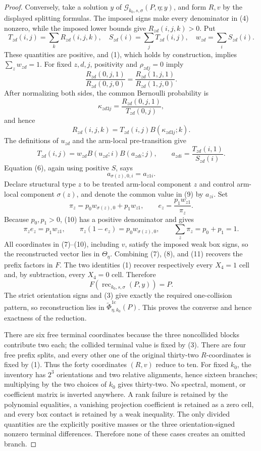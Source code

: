 \documentclass{article}
\begin{document}
\begin{proof}
Conversely, take a solution \(y\) of \(\mathscr G_{k_0,s,\sigma}(P,\eta;y)\), and form \(R,v\) by the displayed splitting formulas.  The imposed signs make every denominator in (4) nonzero, while the imposed lower bounds give \(R_{zd}(i,j,k)>0\).  Put
\[
 T_{zd}(i,j)=\sum_kR_{zd}(i,j,k),\quad
 S_{zd}(i)=\sum_jT_{zd}(i,j),\quad
 w_{zd}=\sum_iS_{zd}(i).
\]
These quantities are positive, and (1), which holds by construction, implies \(\sum_z w_{zd}=1\).  For fixed \(z,d,j\), positivity and \(\rho_{zdj}=0\) imply
\[
 \frac{R_{zd}(0,j,1)}{R_{zd}(0,j,0)}
 =\frac{R_{zd}(1,j,1)}{R_{zd}(1,j,0)}.
\]
After normalizing both sides, the common Bernoulli probability is
\[
 \kappa_{zd3j}=\frac{R_{zd}(0,j,1)}{T_{zd}(0,j)},
 \]
and hence
\[
 R_{zd}(i,j,k)=T_{zd}(i,j)B(\kappa_{zd3j};k).
 \tag{7}
\]
The definitions of \(u_{zd}\) and the arm-local pre-transition give
\[
 T_{zd}(i,j)=w_{zd}B(u_{zd};i)B(a_{zdi};j),
 \qquad a_{zdi}=\frac{T_{zd}(i,1)}{S_{zd}(i)}.
 \tag{8}
\]
Equation (6), again using positive \(S\), says
\[
 a_{\sigma(z),0,i}=a_{z1i}.
 \tag{9}
\]
Declare structural type \(z\) to be treated arm-local component \(z\) and control arm-local component \(\sigma(z)\), and denote the common value in (9) by \(a_{zi}\).  Set
\[
 \pi_z=p_0w_{\sigma(z),0}+p_1w_{z1},
 \qquad e_z=\frac{p_1w_{z1}}{\pi_z}.
 \tag{10}
\]
Because \(p_0,p_1>0\), (10) has a positive denominator and gives
\[
 \pi_ze_z=p_1w_{z1},\qquad
 \pi_z(1-e_z)=p_0w_{\sigma(z),0},\qquad
 \sum_z\pi_z=p_0+p_1=1.
 \tag{11}
\]
All coordinates in (7)--(10), including \(v\), satisfy the imposed weak box signs, so the reconstructed vector lies in \(\Theta_\eta\).  Combining (7), (8), and (11) recovers the prefix factors in \(F\).  The two identities (1) recover respectively every \(X_4=1\) cell and, by subtraction, every \(X_4=0\) cell.  Therefore
\[
 F(\operatorname{rec}_{k_0,s,\sigma}(P,y))=P.
\]
The strict orientation signs and (3) give exactly the required one-collision pattern, so reconstruction lies in \(\widetilde\Phi_{\eta,k_0}^{1\mathrm c}(P)\).  This proves the converse and hence exactness of the reduction.

There are six free terminal coordinates because the three noncollided blocks contribute two each; the collided terminal value is fixed by (3).  There are four free prefix splits, and every other one of the original thirty-two \(R\)-coordinates is fixed by (1).  Thus the forty coordinates \((R,v)\) reduce to ten.  For fixed \(k_0\), the inventory has \(2^3\) orientations and two relative alignments, hence sixteen branches; multiplying by the two choices of \(k_0\) gives thirty-two.  No spectral, moment, or coefficient matrix is inverted anywhere.  A rank failure is retained by the polynomial equalities, a vanishing projection coefficient is retained as a zero cell, and every box contact is retained by a weak inequality.  The only divided quantities are the explicitly positive masses or the three orientation-signed nonzero terminal differences.  Therefore none of these cases creates an omitted branch.
\end{proof}
\end{document}
